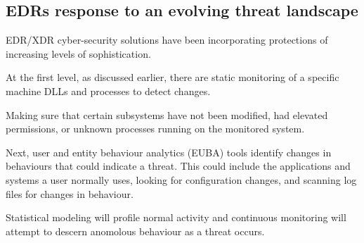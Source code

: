 





\subsection{EDRs response to an evolving threat landscape}

EDR/XDR cyber-security solutions have been incorporating protections of increasing levels of sophistication.

At the first level, as discussed earlier, there are static monitoring of a specific machine DLLs and processes to detect changes.

Making sure that certain subsystems have not been modified, had elevated permissions, or unknown processes running on the monitored system.

Next, user and entity behaviour analytics (EUBA) tools identify changes in behaviours that could indicate a threat.  This could include the
applications and systems a user normally uses, looking for configuration changes, and scanning log files for changes in behaviour.

Statistical modeling will profile normal activity and continuous monitoring will attempt to descern anomolous behaviour as a threat occurs.

